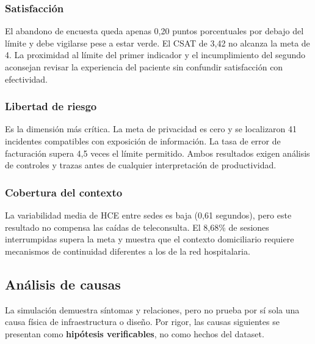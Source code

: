 \subsubsection{Satisfacción}

El abandono de encuesta queda apenas 0,20 puntos porcentuales por debajo del límite y debe vigilarse pese a estar verde. El CSAT de 3,42 no alcanza la meta de 4. La proximidad al límite del primer indicador y el incumplimiento del segundo aconsejan revisar la experiencia del paciente sin confundir satisfacción con efectividad.

\subsubsection{Libertad de riesgo}

Es la dimensión más crítica. La meta de privacidad es cero y se localizaron 41 incidentes compatibles con exposición de información. La tasa de error de facturación supera 4,5 veces el límite permitido. Ambos resultados exigen análisis de controles y trazas antes de cualquier interpretación de productividad.

\subsubsection{Cobertura del contexto}

La variabilidad media de HCE entre sedes es baja (0,61 segundos), pero este resultado no compensa las caídas de teleconsulta. El 8,68\% de sesiones interrumpidas supera la meta y muestra que el contexto domiciliario requiere mecanismos de continuidad diferentes a los de la red hospitalaria.

\subsection{Análisis de causas}


La simulación demuestra síntomas y relaciones, pero no prueba por sí sola una causa física de infraestructura o diseño. Por rigor, las causas siguientes se presentan como \textbf{hipótesis verificables}, no como hechos del dataset.

